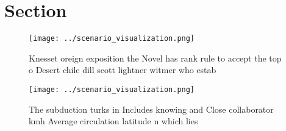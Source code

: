 \documentclass[a4paper]{article}
\begin{document}
\section{Section}

\begin{figure}
\centering
\texttt{[image: ../scenario\_visualization.png]}
\caption{Knesset oreign exposition the Novel has rank rule to accept the top o Desert chile dill scott lightner witmer who estab
}
\end{figure}
 
\begin{figure}
\centering
\texttt{[image: ../scenario\_visualization.png]}
\caption{The subduction turks in Includes knowing and Close collaborator kmh Average circulation latitude n which lies
}
\end{figure}
 
\end{document}
